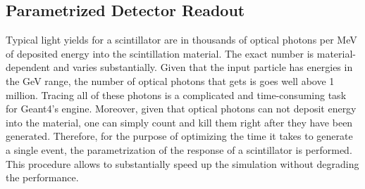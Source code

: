 \subsection{Parametrized Detector Readout}
Typical light yields for a scintillator are in thousands of optical photons per MeV of deposited energy into the scintillation material. The exact number is material-dependent and varies substantially. Given that the input particle has energies in the GeV range, the number of optical photons that gets is goes well above 1 million. Tracing all of these photons is a complicated and time-consuming task for {\sc Geant4}'s engine. Moreover, given that optical photons can not deposit energy into the material, one can simply count and kill them right after they have been generated. Therefore, for the purpose of optimizing the time it takes to generate a single event, the parametrization of the response of a scintillator is performed. This procedure allows to substantially speed up the simulation without degrading the performance.

